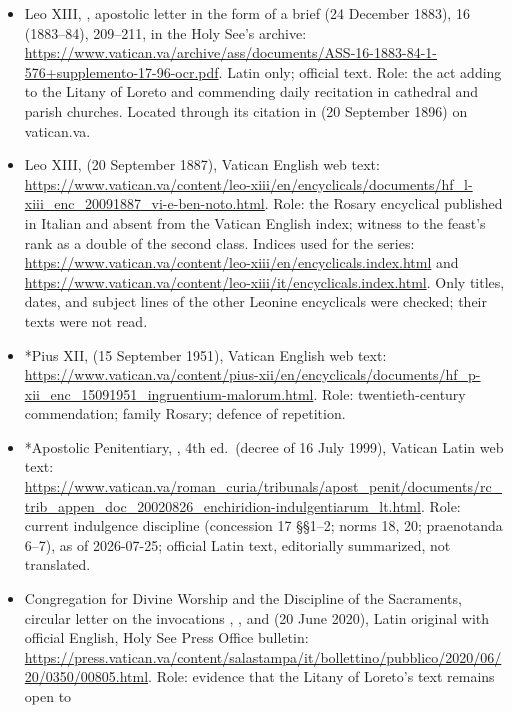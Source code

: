 \begin{itemize}
historical (superseded) 1883 indulgences and October prescription.
\item Leo XIII, , apostolic letter in the form of
a brief (24 December 1883),  16 (1883--84),
209--211, in the Holy See's  archive:
\url{https://www.vatican.va/archive/ass/documents/ASS-16-1883-84-1-576+supplemento-17-96-ocr.pdf}.
Latin only; official text. Role: the act adding  to the Litany of Loreto and commending daily
recitation in cathedral and parish churches. Located through its
citation in  (20 September 1896) on
vatican.va.
\item Leo XIII,  (20 September 1887), Vatican
English web text:
\url{https://www.vatican.va/content/leo-xiii/en/encyclicals/documents/hf_l-xiii_enc_20091887_vi-e-ben-noto.html}.
Role: the Rosary encyclical published in Italian and absent from the
Vatican English index; witness to the feast's rank as a double of the
second class. Indices used for the series:
\url{https://www.vatican.va/content/leo-xiii/en/encyclicals.index.html}
and
\url{https://www.vatican.va/content/leo-xiii/it/encyclicals.index.html}.
Only titles, dates, and subject lines of the other Leonine encyclicals
were checked; their texts were not read.
\item *Pius XII,  (15 September 1951),
Vatican English web text:
\url{https://www.vatican.va/content/pius-xii/en/encyclicals/documents/hf_p-xii_enc_15091951_ingruentium-malorum.html}.
Role: twentieth-century commendation; family Rosary; defence of
repetition.
\item *Apostolic Penitentiary, , 4th ed.\ (decree of 16 July 1999), Vatican
Latin web text:
\url{https://www.vatican.va/roman_curia/tribunals/apost_penit/documents/rc_trib_appen_doc_20020826_enchiridion-indulgentiarum_lt.html}.
Role: current indulgence discipline (concession 17 \S\S 1--2; norms 18,
20; praenotanda 6--7), as of 2026-07-25; official Latin text,
editorially summarized, not translated.
\item Congregation for Divine Worship and the Discipline of the
Sacraments, circular letter on the invocations , , and  (20
June 2020), Latin original with official English, Holy See Press Office
bulletin:
\url{https://press.vatican.va/content/salastampa/it/bollettino/pubblico/2020/06/20/0350/00805.html}.
Role: evidence that the Litany of Loreto's text remains open to

\end{itemize}
